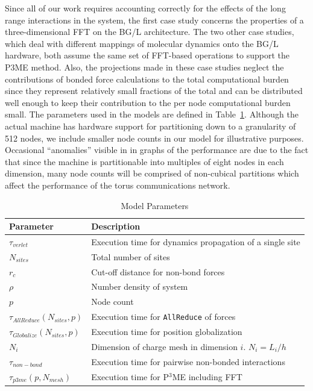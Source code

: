 \documentclass[doublespacing]{elsart}
\newcommand{\verlettime}{\ensuremath{\tau_{verlet}}}
\newcommand{\sitecount}{\ensuremath{{N_{sites}}}}
\newcommand{\rcutoff}{\ensuremath{r_{c}}}
\newcommand{\density}{\ensuremath{\rho}}
\newcommand{\nonbondtime}{\ensuremath{\tau_{non-bond}}}
\newcommand{\nodecount}{\ensuremath{p}}
\newcommand{\allreducetime}{\ensuremath{\tau_{AllReduce}(\sitecount,\nodecount)}}
\newcommand{\globalizepostime}{\ensuremath{\tau_{Globalize}(\sitecount, \nodecount)}}
\newcommand{\meshsize}[1]{\ensuremath{N_{#1}}}
\newcommand{\pmetime}{\ensuremath{\tau_{p3me}(\nodecount,\meshsize{mesh})}}
\begin{document}
Since all of our work requires accounting correctly for the effects of
the long range interactions in the system, the first case study
concerns the properties of a three-dimensional FFT on the BG/L
architecture. The two other case studies, which deal with different
mappings of molecular dynamics onto the BG/L hardware, both assume
the same set of FFT-based operations to support the P3ME method.
Also, the projections made in these case studies neglect the
contributions of bonded force calculations to the total computational
burden since they represent relatively small fractions of the total
and can be distributed well enough to keep their contribution to the
per node computational burden small.  The parameters used in the
models are defined in Table~\ref{tab:model_params}.  Although the
actual machine has hardware support for partitioning down to a
granularity of 512 nodes, we include smaller node counts in our model
for illustrative purposes. Occasional ``anomalies'' visible in in
graphs of the performance are due to the fact that since the machine
is partitionable into multiples of eight nodes in each dimension, many
node counts will be comprised of non-cubical partitions which affect
the performance of the torus communications network.

\begin{table}
\begin{tabular}{|l|l|}\hline
Parameter & Description\\ \hline\hline
\verlettime & Execution time for dynamics propagation of a single site
\\ \hline
\sitecount & Total number of sites \\ \hline
\rcutoff & Cut-off distance for non-bond forces \\ \hline
\density & Number density of system \\ \hline
\nodecount & Node count \\ \hline
\allreducetime & Execution time for {\tt AllReduce} of forces \\ \hline
\globalizepostime & Execution time for position globalization \\ \hline
\meshsize{i} & Dimension of charge mesh in dimension $i$. $\meshsize{i} = L_i/h$ \\ \hline
\nonbondtime & Execution time for pairwise non-bonded interactions \\ \hline
\pmetime & Execution time for P$^3$ME including FFT \\ \hline
\end{tabular}
\caption{Model Parameters}
\label{tab:model_params}
\end{table}
\end{document}
